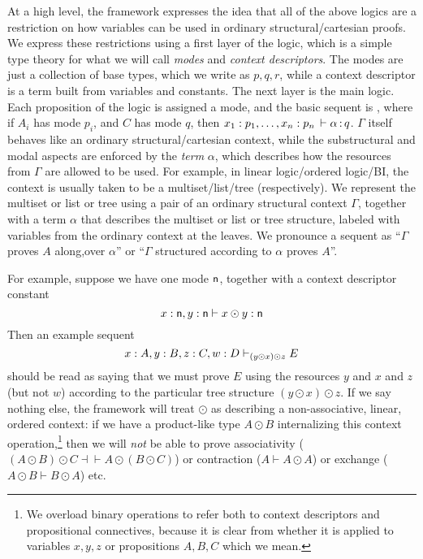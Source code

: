 At a high level, the framework expresses the idea that all of the above
logics are a restriction on how variables can be used in ordinary
structural/cartesian proofs.  We express these restrictions using a
first layer of the logic, which is a simple type theory for what we will
call \emph{modes} and \emph{context descriptors}.  The modes are just a
collection of base types, which we write as $p,q,r$, while a context
descriptor is a term built from variables and constants.  The next layer
is the main logic.  Each proposition of the logic is assigned a mode,
and the basic sequent is ,
where if $A_i$ has mode $p_i$, and $C$ has mode $q$, then $x_1 :
  p_1,\ldots, x_n : p_n \, \vdash \alpha \, \mathit{:} \, q$.  
$\Gamma$ itself behaves like an ordinary structural/cartesian context,
while the substructural and modal aspects are enforced by the
\emph{term} $\alpha$, which describes how the resources from $\Gamma$
are allowed to be used.  For example, in linear logic/ordered logic/BI,
the context is usually taken to be a multiset/list/tree (respectively).
We represent the multiset or list or tree using a pair of an ordinary
structural context $\Gamma$, together with a term $\alpha$ that
describes the multiset or list or tree structure, labeled with variables
from the ordinary context at the leaves.  We pronounce a sequent
 as ``$\Gamma$ proves $A$ {along,over} $\alpha$''
or ``$\Gamma$ structured according to $\alpha$ proves $A$''.

For example, suppose we have one mode $\mathsf{n}$, together with a context
descriptor constant
\[
x : \mathsf{n}, y:\mathsf{n} \vdash x \odot y : \mathsf{n}
\]
Then an example sequent
\[
x:A, y:B, z:C, w:D \vdash_{(y \odot x) \odot z} E
\]
should be read as saying that we must prove $E$ using the resources $y$
and $x$ and $z$ (but not $w$) according to the particular tree structure
${(y \odot x) \odot z}$.  If we say nothing else, the framework will
treat $\odot$ as describing a non-associative, linear, ordered context:
if we have a product-like type $A \odot B$ internalizing this context
operation,\footnote{We overload binary operations to refer both to
  context descriptors and propositional connectives, because it is clear
  from whether it is applied to variables $x,y,z$ or propositions
  $A,B,C$ which we mean.}  then we will \emph{not} be able to prove
associativity ($(A \odot B) \odot C \dashv\vdash A \odot (B \odot C)$)
or contraction ($A \vdash A \odot A$) or exchange ($A \odot B \vdash B
\odot A$) etc.

